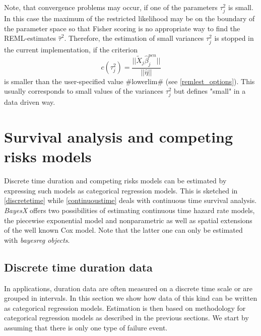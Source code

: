 Note, that convergence problems may occur, if one of the
parameters $\tau_j^2$ is small. In this case the maximum of the
restricted likelihood may be on the boundary of the parameter
space so that Fisher scoring is no appropriate way to find the
REML-estimates $\hat{\tau}^2$. Therefore, the estimation of small
variances $\tau_j^2$ is stopped in the current implementation, if
the criterion
\begin{equation}\label{remlstopcrit}
 c(\tau_j^2)=\frac{||\tilde{X}_j\hat{\beta}_j^{pen}||}{||\hat{\eta}||}
\end{equation}
is smaller than the user-specified value #lowerlim# (see
\autoref{remlest_options}). This usually corresponds to small
values of the variances $\tau_j^2$ but defines "small" in a data
driven way.

\section{Survival analysis and competing risks models}
\label{survivalAnalysis}

Discrete time duration and competing risks models can be estimated
by expressing such models as categorical regression models. This
is sketched in \autoref{discretetime} while
\autoref{continuoustime} deals with continuous time survival
analysis. \textit{BayesX} offers two possibilities of estimating
continuous time hazard rate models, the piecewise exponential
model and nonparametric as well as spatial extensions of the well
known Cox model. Note that the latter one can only be estimated
with {\em bayesreg objects}.


\subsection{Discrete time duration data}
\label{discretetime}

In applications, duration data are often measured on a discrete
time scale or are grouped in intervals. In this section we show
how data of this kind can be written as categorical regression
models.  Estimation is then based on methodology for categorical
regression models as described in the previous sections. We start
by assuming that there is only one type of failure event.


